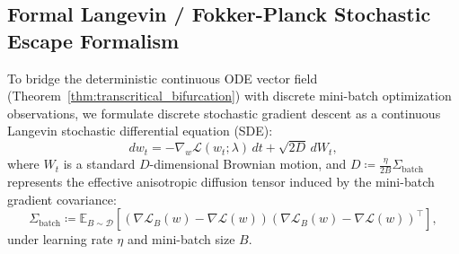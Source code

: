 \documentclass{article}
\theoremstyle{plain}
\theoremstyle{definition}
\begin{document}
\subsection{Formal Langevin / Fokker-Planck Stochastic Escape Formalism}
\label{sec:app_langevin_escape}
To bridge the deterministic continuous ODE vector field (Theorem~\ref{thm:transcritical_bifurcation}) with discrete mini-batch optimization observations, we formulate discrete stochastic gradient descent as a continuous Langevin stochastic differential equation (SDE):
\begin{equation}
    d w_t = -\nabla_w \mathcal{L}(w_t; \lambda) \, dt + \sqrt{2 D} \, dW_t,
    \label{eq:langevin_sde}
\end{equation}
where $W_t$ is a standard $D$-dimensional Brownian motion, and $D \coloneqq \frac{\eta}{2 B} \Sigma_{\text{batch}}$ represents the effective anisotropic diffusion tensor induced by the mini-batch gradient covariance:
\begin{equation}
    \Sigma_{\text{batch}} \coloneqq \mathbb{E}_{B \sim \mathcal{D}} \left[ \left( \nabla \mathcal{L}_B(w) - \nabla \mathcal{L}(w) \right) \left( \nabla \mathcal{L}_B(w) - \nabla \mathcal{L}(w) \right)^\top \right],
\end{equation}
under learning rate $\eta$ and mini-batch size $B$.
\end{document}
